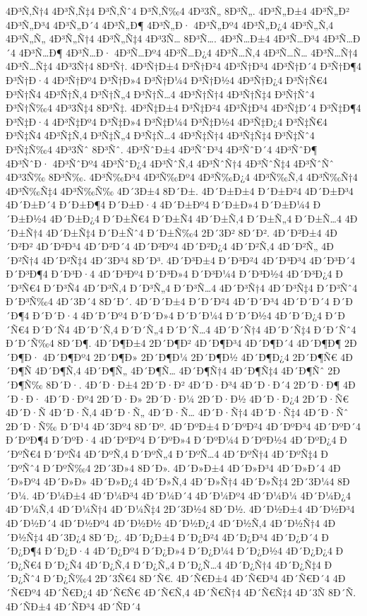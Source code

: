 {4Ð³Ñ‚Ñ†4
4Ð³Ñ‚Ñ‡4
Ð³Ñ‚Ñˆ4
Ð³Ñ‚Ñ‰4
4Ð³3Ñ„
8Ð³Ñ„.
4Ð³Ñ„Ð±4
4Ð³Ñ„Ð²
4Ð³Ñ„Ð³4
4Ð³Ñ„Ð´4
4Ð³Ñ„Ð¶
4Ð³Ñ„Ð·
4Ð³Ñ„Ðº4
4Ð³Ñ„Ð¿4
4Ð³Ñ„Ñ‚4
4Ð³Ñ„Ñ„
4Ð³Ñ„Ñ†4
4Ð³Ñ„Ñ‡4
4Ð³3Ñ…
8Ð³Ñ….
4Ð³Ñ…Ð±4
4Ð³Ñ…Ð³4
4Ð³Ñ…Ð´4
4Ð³Ñ…Ð¶
4Ð³Ñ…Ð·
4Ð³Ñ…Ðº4
4Ð³Ñ…Ð¿4
4Ð³Ñ…Ñ‚4
4Ð³Ñ…Ñ…
4Ð³Ñ…Ñ†4
4Ð³Ñ…Ñ‡4
4Ð³3Ñ†4
8Ð³Ñ†.
4Ð³Ñ†Ð±4
Ð³Ñ†Ð²4
4Ð³Ñ†Ð³4
4Ð³Ñ†Ð´4
Ð³Ñ†Ð¶4
Ð³Ñ†Ð·4
4Ð³Ñ†Ðº4
Ð³Ñ†Ð»4
Ð³Ñ†Ð¼4
Ð³Ñ†Ð½4
4Ð³Ñ†Ð¿4
Ð³Ñ†Ñ€4
Ð³Ñ†Ñ4
4Ð³Ñ†Ñ‚4
Ð³Ñ†Ñ„4
Ð³Ñ†Ñ…4
4Ð³Ñ†Ñ†4
4Ð³Ñ†Ñ‡4
Ð³Ñ†Ñˆ4
Ð³Ñ†Ñ‰4
4Ð³3Ñ‡4
8Ð³Ñ‡.
4Ð³Ñ‡Ð±4
Ð³Ñ‡Ð²4
4Ð³Ñ‡Ð³4
4Ð³Ñ‡Ð´4
Ð³Ñ‡Ð¶4
Ð³Ñ‡Ð·4
4Ð³Ñ‡Ðº4
Ð³Ñ‡Ð»4
Ð³Ñ‡Ð¼4
Ð³Ñ‡Ð½4
4Ð³Ñ‡Ð¿4
Ð³Ñ‡Ñ€4
Ð³Ñ‡Ñ4
4Ð³Ñ‡Ñ‚4
Ð³Ñ‡Ñ„4
Ð³Ñ‡Ñ…4
4Ð³Ñ‡Ñ†4
4Ð³Ñ‡Ñ‡4
Ð³Ñ‡Ñˆ4
Ð³Ñ‡Ñ‰4
4Ð³3Ñˆ
8Ð³Ñˆ.
4Ð³ÑˆÐ±4
4Ð³ÑˆÐ³4
4Ð³ÑˆÐ´4
4Ð³ÑˆÐ¶
4Ð³ÑˆÐ·
4Ð³ÑˆÐº4
4Ð³ÑˆÐ¿4
4Ð³ÑˆÑ‚4
4Ð³ÑˆÑ†4
4Ð³ÑˆÑ‡4
4Ð³ÑˆÑˆ
4Ð³3Ñ‰
8Ð³Ñ‰.
4Ð³Ñ‰Ð³4
4Ð³Ñ‰Ðº4
4Ð³Ñ‰Ð¿4
4Ð³Ñ‰Ñ‚4
4Ð³Ñ‰Ñ†4
4Ð³Ñ‰Ñ‡4
4Ð³Ñ‰Ñ‰
4Ð´3Ð±4
8Ð´Ð±.
4Ð´Ð±Ð±4
Ð´Ð±Ð²4
4Ð´Ð±Ð³4
4Ð´Ð±Ð´4
Ð´Ð±Ð¶4
Ð´Ð±Ð·4
4Ð´Ð±Ðº4
Ð´Ð±Ð»4
Ð´Ð±Ð¼4
Ð´Ð±Ð½4
4Ð´Ð±Ð¿4
Ð´Ð±Ñ€4
Ð´Ð±Ñ4
4Ð´Ð±Ñ‚4
Ð´Ð±Ñ„4
Ð´Ð±Ñ…4
4Ð´Ð±Ñ†4
4Ð´Ð±Ñ‡4
Ð´Ð±Ñˆ4
Ð´Ð±Ñ‰4
2Ð´3Ð²
8Ð´Ð².
4Ð´Ð²Ð±4
4Ð´Ð²Ð²
4Ð´Ð²Ð³4
4Ð´Ð²Ð´4
4Ð´Ð²Ðº4
4Ð´Ð²Ð¿4
4Ð´Ð²Ñ‚4
4Ð´Ð²Ñ„
4Ð´Ð²Ñ†4
4Ð´Ð²Ñ‡4
4Ð´3Ð³4
8Ð´Ð³.
4Ð´Ð³Ð±4
Ð´Ð³Ð²4
4Ð´Ð³Ð³4
4Ð´Ð³Ð´4
Ð´Ð³Ð¶4
Ð´Ð³Ð·4
4Ð´Ð³Ðº4
Ð´Ð³Ð»4
Ð´Ð³Ð¼4
Ð´Ð³Ð½4
4Ð´Ð³Ð¿4
Ð´Ð³Ñ€4
Ð´Ð³Ñ4
4Ð´Ð³Ñ‚4
Ð´Ð³Ñ„4
Ð´Ð³Ñ…4
4Ð´Ð³Ñ†4
4Ð´Ð³Ñ‡4
Ð´Ð³Ñˆ4
Ð´Ð³Ñ‰4
4Ð´3Ð´4
8Ð´Ð´.
4Ð´Ð´Ð±4
Ð´Ð´Ð²4
4Ð´Ð´Ð³4
4Ð´Ð´Ð´4
Ð´Ð´Ð¶4
Ð´Ð´Ð·4
4Ð´Ð´Ðº4
Ð´Ð´Ð»4
Ð´Ð´Ð¼4
Ð´Ð´Ð½4
4Ð´Ð´Ð¿4
Ð´Ð´Ñ€4
Ð´Ð´Ñ4
4Ð´Ð´Ñ‚4
Ð´Ð´Ñ„4
Ð´Ð´Ñ…4
4Ð´Ð´Ñ†4
4Ð´Ð´Ñ‡4
Ð´Ð´Ñˆ4
Ð´Ð´Ñ‰4
8Ð´Ð¶.
4Ð´Ð¶Ð±4
2Ð´Ð¶Ð²
4Ð´Ð¶Ð³4
4Ð´Ð¶Ð´4
4Ð´Ð¶Ð¶
2Ð´Ð¶Ð·
4Ð´Ð¶Ðº4
2Ð´Ð¶Ð»
2Ð´Ð¶Ð¼
2Ð´Ð¶Ð½
4Ð´Ð¶Ð¿4
2Ð´Ð¶Ñ€
4Ð´Ð¶Ñ
4Ð´Ð¶Ñ‚4
4Ð´Ð¶Ñ„
4Ð´Ð¶Ñ…
4Ð´Ð¶Ñ†4
4Ð´Ð¶Ñ‡4
4Ð´Ð¶Ñˆ
2Ð´Ð¶Ñ‰
8Ð´Ð·.
4Ð´Ð·Ð±4
2Ð´Ð·Ð²
4Ð´Ð·Ð³4
4Ð´Ð·Ð´4
2Ð´Ð·Ð¶
4Ð´Ð·Ð·
4Ð´Ð·Ðº4
2Ð´Ð·Ð»
2Ð´Ð·Ð¼
2Ð´Ð·Ð½
4Ð´Ð·Ð¿4
2Ð´Ð·Ñ€
4Ð´Ð·Ñ
4Ð´Ð·Ñ‚4
4Ð´Ð·Ñ„
4Ð´Ð·Ñ…
4Ð´Ð·Ñ†4
4Ð´Ð·Ñ‡4
4Ð´Ð·Ñˆ
2Ð´Ð·Ñ‰
Ð´Ð¹4
4Ð´3Ðº4
8Ð´Ðº.
4Ð´ÐºÐ±4
Ð´ÐºÐ²4
4Ð´ÐºÐ³4
4Ð´ÐºÐ´4
Ð´ÐºÐ¶4
Ð´ÐºÐ·4
4Ð´ÐºÐº4
Ð´ÐºÐ»4
Ð´ÐºÐ¼4
Ð´ÐºÐ½4
4Ð´ÐºÐ¿4
Ð´ÐºÑ€4
Ð´ÐºÑ4
4Ð´ÐºÑ‚4
Ð´ÐºÑ„4
Ð´ÐºÑ…4
4Ð´ÐºÑ†4
4Ð´ÐºÑ‡4
Ð´ÐºÑˆ4
Ð´ÐºÑ‰4
2Ð´3Ð»4
8Ð´Ð».
4Ð´Ð»Ð±4
4Ð´Ð»Ð³4
4Ð´Ð»Ð´4
4Ð´Ð»Ðº4
4Ð´Ð»Ð»
4Ð´Ð»Ð¿4
4Ð´Ð»Ñ‚4
4Ð´Ð»Ñ†4
4Ð´Ð»Ñ‡4
2Ð´3Ð¼4
8Ð´Ð¼.
4Ð´Ð¼Ð±4
4Ð´Ð¼Ð³4
4Ð´Ð¼Ð´4
4Ð´Ð¼Ðº4
4Ð´Ð¼Ð¼
4Ð´Ð¼Ð¿4
4Ð´Ð¼Ñ‚4
4Ð´Ð¼Ñ†4
4Ð´Ð¼Ñ‡4
2Ð´3Ð½4
8Ð´Ð½.
4Ð´Ð½Ð±4
4Ð´Ð½Ð³4
4Ð´Ð½Ð´4
4Ð´Ð½Ðº4
4Ð´Ð½Ð½
4Ð´Ð½Ð¿4
4Ð´Ð½Ñ‚4
4Ð´Ð½Ñ†4
4Ð´Ð½Ñ‡4
4Ð´3Ð¿4
8Ð´Ð¿.
4Ð´Ð¿Ð±4
Ð´Ð¿Ð²4
4Ð´Ð¿Ð³4
4Ð´Ð¿Ð´4
Ð´Ð¿Ð¶4
Ð´Ð¿Ð·4
4Ð´Ð¿Ðº4
Ð´Ð¿Ð»4
Ð´Ð¿Ð¼4
Ð´Ð¿Ð½4
4Ð´Ð¿Ð¿4
Ð´Ð¿Ñ€4
Ð´Ð¿Ñ4
4Ð´Ð¿Ñ‚4
Ð´Ð¿Ñ„4
Ð´Ð¿Ñ…4
4Ð´Ð¿Ñ†4
4Ð´Ð¿Ñ‡4
Ð´Ð¿Ñˆ4
Ð´Ð¿Ñ‰4
2Ð´3Ñ€4
8Ð´Ñ€.
4Ð´Ñ€Ð±4
4Ð´Ñ€Ð³4
4Ð´Ñ€Ð´4
4Ð´Ñ€Ðº4
4Ð´Ñ€Ð¿4
4Ð´Ñ€Ñ€
4Ð´Ñ€Ñ‚4
4Ð´Ñ€Ñ†4
4Ð´Ñ€Ñ‡4
4Ð´3Ñ
8Ð´Ñ.
4Ð´ÑÐ±4
4Ð´ÑÐ³4
4Ð´ÑÐ´4
}
